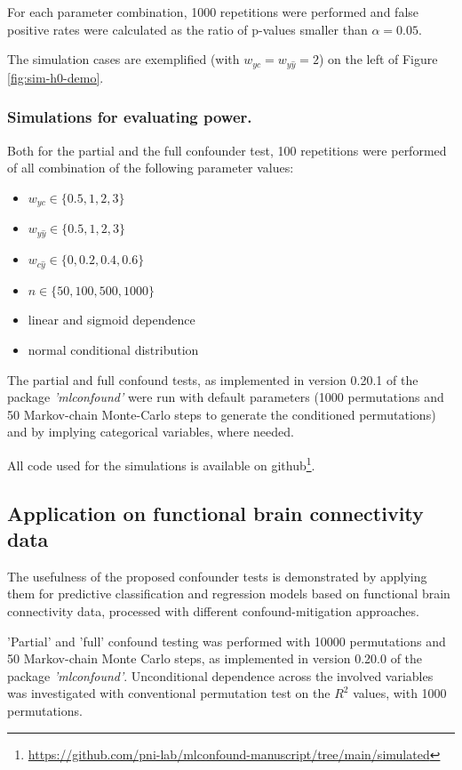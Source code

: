 \documentclass{article}
\begin{document}
For each parameter combination, 1000 repetitions were performed and false positive rates were calculated as the ratio of p-values smaller than $\alpha = 0.05$.

The simulation cases are exemplified (with $w_{yc} = w_{y\hat{y}} = 2$) on the left of Figure \ref{fig:sim-h0-demo}.

\subsubsection*{Simulations for evaluating power.}

Both for the partial and the full confounder test, 100 repetitions were performed of all combination of the following parameter values: 
\begin{itemize}
    \item $w_{yc} \in \{0.5, 1, 2, 3\}$
    \item $w_{y\hat{y}} \in \{0.5, 1, 2, 3\}$
    \item $w_{c\hat{y}} \in \{0, 0.2, 0.4, 0.6\}$
    \item $n \in \{50, 100, 500, 1000\}$
    \item linear and sigmoid dependence
    \item normal conditional distribution
\end{itemize}

The partial and full confound tests, as implemented in version 0.20.1 of the package \emph{'mlconfound'} were run with default parameters (1000 permutations and 50 Markov-chain Monte-Carlo steps to generate the conditioned permutations) and by implying categorical variables, where needed.

All code used for the simulations is available on github\footnote{\href{https://github.com/pni-lab/mlconfound-manuscript/tree/main/simulated}{https://github.com/pni-lab/mlconfound-manuscript/tree/main/simulated}}.

\subsection{Application on functional brain connectivity data}

The usefulness of the proposed confounder tests is demonstrated by applying them for predictive classification and regression models based on functional brain connectivity data, processed with different confound-mitigation approaches. 

'Partial' and 'full' confound testing was performed with 10000 permutations and 50 Markov-chain Monte Carlo steps, as implemented in version 0.20.0 of the package \emph{'mlconfound'}. Unconditional dependence across the involved variables was investigated with conventional permutation test on the $R^2$ values, with 1000 permutations. 
\end{document}
